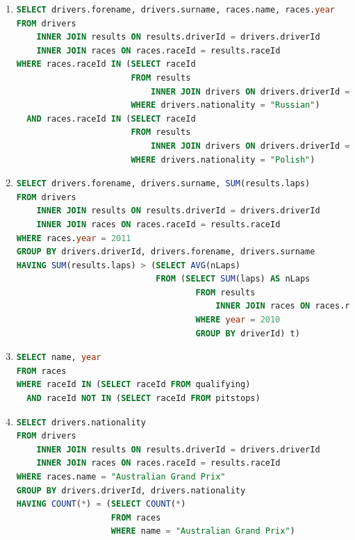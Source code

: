 \documentclass{db-practice}
\begin{document}
\begin{enumerate}
\item
\begin{lstlisting}[language=SQL]
SELECT drivers.forename, drivers.surname, races.name, races.year
FROM drivers
    INNER JOIN results ON results.driverId = drivers.driverId
    INNER JOIN races ON races.raceId = results.raceId
WHERE races.raceId IN (SELECT raceId
                       FROM results 
                           INNER JOIN drivers ON drivers.driverId = results.driverId
                       WHERE drivers.nationality = "Russian")
  AND races.raceId IN (SELECT raceId
                       FROM results 
                           INNER JOIN drivers ON drivers.driverId = results.driverId
                       WHERE drivers.nationality = "Polish")
\end{lstlisting}
      
\item
\begin{lstlisting}[language=SQL]
SELECT drivers.forename, drivers.surname, SUM(results.laps)
FROM drivers
    INNER JOIN results ON results.driverId = drivers.driverId
    INNER JOIN races ON races.raceId = results.raceId
WHERE races.year = 2011
GROUP BY drivers.driverId, drivers.forename, drivers.surname
HAVING SUM(results.laps) > (SELECT AVG(nLaps)
                            FROM (SELECT SUM(laps) AS nLaps
                                    FROM results
                                        INNER JOIN races ON races.raceId = results.raceId
                                    WHERE year = 2010
                                    GROUP BY driverId) t)
\end{lstlisting}

\item
\begin{lstlisting}[language=SQL]
SELECT name, year
FROM races
WHERE raceId IN (SELECT raceId FROM qualifying)
  AND raceId NOT IN (SELECT raceId FROM pitstops)
\end{lstlisting}

\item
\begin{lstlisting}[language=SQL]
SELECT drivers.nationality
FROM drivers
    INNER JOIN results ON results.driverId = drivers.driverId
    INNER JOIN races ON races.raceId = results.raceId
WHERE races.name = "Australian Grand Prix"
GROUP BY drivers.driverId, drivers.nationality
HAVING COUNT(*) = (SELECT COUNT(*)
                   FROM races
                   WHERE name = "Australian Grand Prix")
\end{lstlisting}


\end{enumerate}
\end{document}
